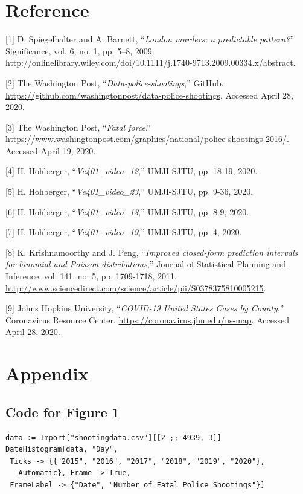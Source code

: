 \documentclass[a4paper]{article}
\begin{document}
\section{Reference}
[1] D. Spiegelhalter and A. Barnett, “\textit{London murders: a predictable pattern?}” Significance, vol. 6, no. 1, pp. 5–8, 2009. \url{http://onlinelibrary.wiley.com/doi/10.1111/j.1740-9713.2009.00334.x/abstract}.

[2] The Washington Post, “\textit{Data-police-shootings},” GitHub. \url{https://github.com/washingtonpost/data-police-shootings}. Accessed April 28, 2020.

[3] The Washington Post, “\textit{Fatal force}.” \url{https://www.washingtonpost.com/graphics/national/police-shootings-2016/}. Accessed April 19, 2020.

[4] H. Hohberger, “\textit{Ve401\_video\_12},” UMJI-SJTU, pp. 18-19, 2020.

[5] H. Hohberger, “\textit{Ve401\_video\_23},” UMJI-SJTU, pp. 9-36, 2020.

[6] H. Hohberger, “\textit{Ve401\_video\_13},” UMJI-SJTU, pp. 8-9, 2020.

[7] H. Hohberger, “\textit{Ve401\_video\_19},” UMJI-SJTU, pp. 4, 2020.

[8] K. Krishnamoorthy and J. Peng, “\textit{Improved closed-form prediction intervals for binomial and Poisson distributions},” Journal of Statistical Planning and Inference, vol. 141, no. 5, pp. 1709-1718, 2011. \url{http://www.sciencedirect.com/science/article/pii/S0378375810005215}.

[9] Johns Hopkins University, “\textit{COVID-19 United States Cases by County},” Coronavirus Resource Center.  \url{https://coronavirus.jhu.edu/us-map}. Accessed April 28, 2020.

\newpage
















\section{Appendix}
	\subsection{Code for Figure 1}
\begin{lstlisting}
data := Import["shootingdata.csv"][[2 ;; 4939, 3]]
DateHistogram[data, "Day", 
 Ticks -> {{"2015", "2016", "2017", "2018", "2019", "2020"}, 
   Automatic}, Frame -> True, 
 FrameLabel -> {"Date", "Number of Fatal Police Shootings"}]
\end{lstlisting}
\
\end{document}
